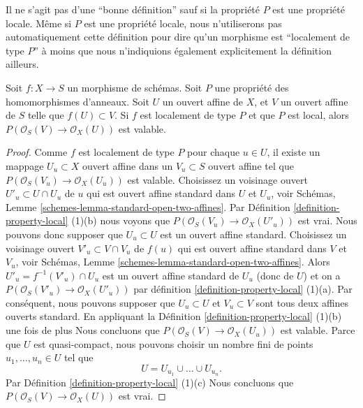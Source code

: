 \noindent
Il ne s'agit pas d'une ``bonne définition'' sauf si la propriété $P$
est une propriété locale. Même si $P$ est une propriété locale, nous n'utiliserons
pas automatiquement cette définition pour dire qu'un morphisme est ``localement
de type $P$'' à moins que nous n'indiquions également explicitement
la définition ailleurs.

\begin{lemma}
\label{lemma-locally-P}
Soit $f : X \to S$ un morphisme de schémas. Soit $P$
une propriété des homomorphismes d'anneaux.
Soit $U$ un ouvert affine
de $X$, et $V$ un ouvert affine de
$S$ telle que
$f(U) \subset V$. Si $f$ est localement de type $P$
et que $P$ est local, alors $P(\mathcal{O}_S(V) \to \mathcal{O}_X(U))$ est valable.
\end{lemma}

\begin{proof}
Comme $f$ est localement de type $P$ pour
chaque $u \in U$, il existe un mappage $U_u \subset X$ ouvert affine
dans un $V_u \subset S$ ouvert affine tel que $P(\mathcal{O}_S(V_u) \to \mathcal{O}_X(U_u))$
est valable. Choisissez un voisinage ouvert $U'_u \subset U \cap U_u$
de $u$ qui est ouvert affine standard
dans $U$ et $U_u$, voir Schémas, Lemme
\ref{schemes-lemma-standard-open-two-affines}. Par Définition \ref{definition-property-local} (1)(b)
nous voyons que $P(\mathcal{O}_S(V_u) \to \mathcal{O}_X(U'_u))$ est vrai. Nous pouvons donc
supposer que $U_u \subset U$ est un ouvert affine standard.
Choisissez un voisinage ouvert $V'_u \subset V \cap V_u$ de
$f(u)$ qui est ouvert affine standard dans $V$
et $V_u$, voir Schémas, Lemme \ref{schemes-lemma-standard-open-two-affines}.
Alors $U'_u = f^{-1}(V'_u) \cap U_u$ est un ouvert affine standard de $U_u$
(donc de $U$) et
on a $P(\mathcal{O}_S(V'_u) \to \mathcal{O}_X(U'_u))$ par définition \ref{definition-property-local} (1)(a).
Par conséquent, nous pouvons supposer
que $U_u \subset U$ et $V_u \subset V$ sont tous deux affines
ouverts standard. En appliquant
la Définition \ref{definition-property-local} (1)(b) une fois
de plus Nous concluons que $P(\mathcal{O}_S(V) \to \mathcal{O}_X(U_u))$ est valable. Parce que $U$
est quasi-compact, nous pouvons choisir un nombre
fini de points $u_1, \ldots, u_n \in U$ tel que
$$
U = U_{u_1} \cup \ldots \cup U_{u_n}.
$$
Par Définition \ref{definition-property-local} (1)(c)
Nous concluons que $P(\mathcal{O}_S(V) \to \mathcal{O}_X(U))$ est vrai.
\end{proof}

